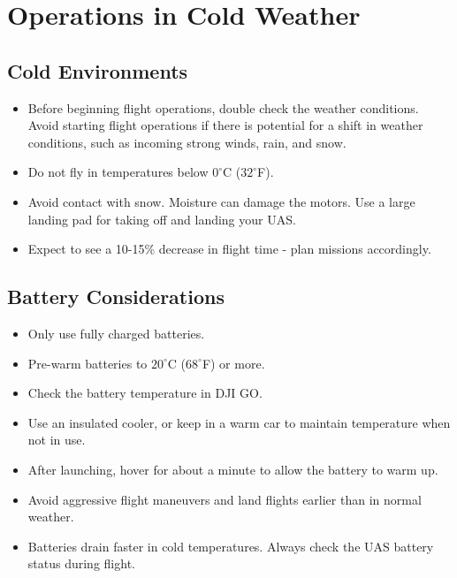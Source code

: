 \documentclass[
]{book}
\providecommand{\tightlist}{%
  \setlength{\itemsep}{0pt}\setlength{\parskip}{0pt}}
\begin{document}
\hypertarget{ch-cold-weather}{%
\chapter{Operations in Cold Weather}\label{ch-cold-weather}}

\hypertarget{cold-environments}{%
\section{Cold Environments}\label{cold-environments}}

\begin{itemize}
\tightlist
\item
  Before beginning flight operations, double check the weather conditions. Avoid starting flight operations if there is potential for a shift in weather conditions, such as incoming strong winds, rain, and snow.
\item
  Do not fly in temperatures below \(0^\circ\)C (\(32^\circ\)F).
\item
  Avoid contact with snow. Moisture can damage the motors. Use a large landing pad for taking off and landing your UAS.
\item
  Expect to see a 10-15\% decrease in flight time - plan missions accordingly.
\end{itemize}

\hypertarget{cold-battery}{%
\section{Battery Considerations}\label{cold-battery}}

\begin{itemize}
\tightlist
\item
  Only use fully charged batteries.
\item
  Pre-warm batteries to \(20^\circ\)C (\(68^\circ\)F) or more.
\item
  Check the battery temperature in DJI GO.
\item
  Use an insulated cooler, or keep in a warm car to maintain temperature when not in use.
\item
  After launching, hover for about a minute to allow the battery to warm up.
\item
  Avoid aggressive flight maneuvers and land flights earlier than in normal weather.
\item
  Batteries drain faster in cold temperatures. Always check the UAS battery status during flight.
\end{itemize}
\end{document}
